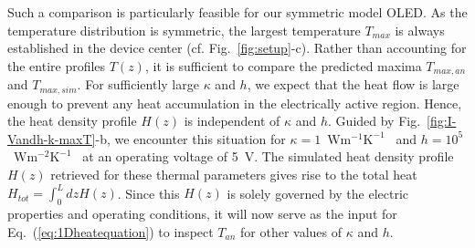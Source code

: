 \documentclass[%
9pt,
 aip,
rsi,%
 amsmath,amssymb,
preprint,%
]{revtex4-1}
\newcommand{\thermalconductivity}{$\mathrm{W m^{-1} K^{-1}}$}
\newcommand{\hcoefficient}{$\mathrm{W m^{-2} K^{-1}}$}
\begin{document}
Such a comparison is particularly feasible for our symmetric model OLED.
As the temperature distribution is symmetric, the largest temperature $T_{max}$ is always established in the device center (cf. Fig.~\ref{fig:setup}-c). Rather than accounting for the entire profiles $T(z)$,
it is sufficient to compare the predicted maxima $T_{max,an}$ and $T_{max,sim}$.
For sufficiently large $\kappa$ and $h$, we expect that the heat flow is large enough to prevent any heat accumulation in the electrically active region. 
Hence, the heat density profile $H(z)$ is independent of $\kappa$ and $h$. %
Guided by Fig.~\ref{fig:I-Vandh-k-maxT}-b, we encounter this situation for $\kappa = 1$~\thermalconductivity~ and $h = 10^5$~\hcoefficient~ at an operating voltage of 5~V.  
The simulated heat density profile $H(z)$ retrieved for these thermal parameters gives rise to the total heat $H_{tot} = \int_0^L dz H(z)$. 
Since this $H(z)$ is solely governed by the electric properties and operating conditions, it will now serve as the input for Eq.~(\ref{eq:1Dheatequation}) to inspect $T_{an}$ for other values of $\kappa$ and $h$.
\end{document}
